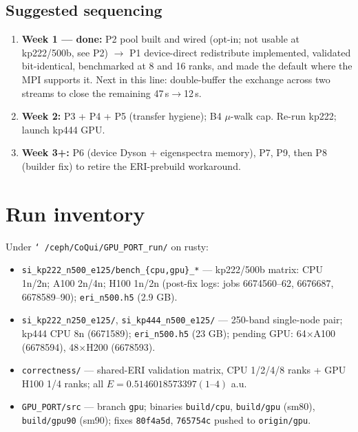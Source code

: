 \documentclass[11pt]{article}
\begin{document}
\subsection{Suggested sequencing}
\begin{enumerate}[leftmargin=1.6em]
\item \textbf{Week 1 --- \textcolor{good}{done}:} P2 pool built and wired (opt-in; not usable at
kp222/500b, see P2) $\rightarrow$ P1 device-direct redistribute implemented, validated
bit-identical, benchmarked at 8 and 16 ranks, and made the default where the MPI supports
it. Next in this line: double-buffer the exchange across two streams to close the
remaining 47\,s$\rightarrow$12\,s.
\item \textbf{Week 2:} P3 + P4 + P5 (transfer hygiene); B4 $\mu$-walk cap. Re-run kp222;
launch kp444 GPU.
\item \textbf{Week 3+:} P6 (device Dyson + eigenspectra memory), P7, P9, then P8
(builder fix) to retire the ERI-prebuild workaround.
\end{enumerate}

\section{Run inventory}
Under \texttt{\char`~/ceph/CoQui/GPU\_PORT\_run/} on rusty:
\begin{itemize}[leftmargin=1.6em]
\item \texttt{si\_kp222\_n500\_e125/bench\_\{cpu,gpu\}\_*} --- kp222/500b matrix: CPU 1n/2n;
A100 2n/4n; H100 1n/2n (post-fix logs: jobs 6674560--62, 6676687, 6678589--90);
\texttt{eri\_n500.h5} (2.9 GB).
\item \texttt{si\_kp222\_n250\_e125/}, \texttt{si\_kp444\_n500\_e125/} --- 250-band
single-node pair; kp444 CPU 8n (6671589); \texttt{eri\_n500.h5} (23 GB); pending GPU:
64$\times$A100 (6678594), 48$\times$H200 (6678593).
\item \texttt{correctness/} --- shared-ERI validation matrix, CPU 1/2/4/8 ranks + GPU
H100 1/4 ranks; all $E = 0.5146018573397(1\text{--}4)$ a.u.
\item \texttt{GPU\_PORT/src} --- branch \texttt{gpu}; binaries \texttt{build/cpu},
\texttt{build/gpu} (sm80), \texttt{build/gpu90} (sm90); fixes \texttt{80f4a5d},
\texttt{765754c} pushed to \texttt{origin/gpu}.
\end{itemize}
\end{document}
